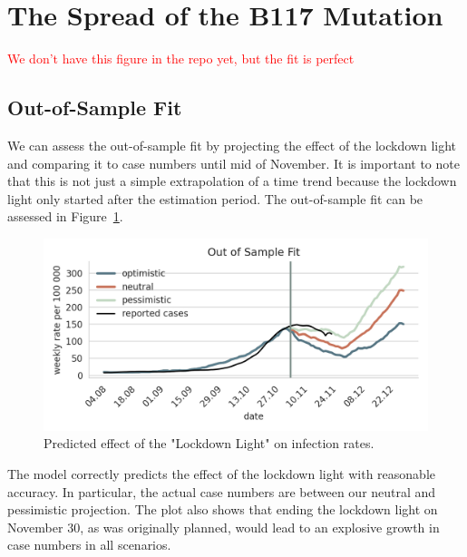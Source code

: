 \FloatBarrier


\section{The Spread of the B117 Mutation}


\textcolor{red}{We don't have this figure in the repo yet, but the fit is perfect}



\FloatBarrier

\subsection{Out-of-Sample Fit}
\label{sub:out_of_sample_fit}

We can assess the out-of-sample fit by projecting the effect of the lockdown light and
comparing it to case numbers until mid of November. It is important to note that this is
not just a simple extrapolation of a time trend because the lockdown light only started
after the estimation period. The out-of-sample fit can be assessed in
Figure~\ref{fig:out-of-sample-fit}.

\begin{figure}[!tp]
    \centering
    \includegraphics[width=\textwidth]{../figures/out_of_sample_validation}
    \caption{Predicted effect of the "Lockdown Light" on infection rates.}
    \label{fig:out-of-sample-fit}
\end{figure}

The model correctly predicts the effect of the lockdown light with reasonable accuracy.
In particular, the actual case numbers are between our neutral and pessimistic
projection. The plot also shows that ending the lockdown light on November 30, as was
originally planned, would lead to an explosive growth in case numbers in all scenarios.
